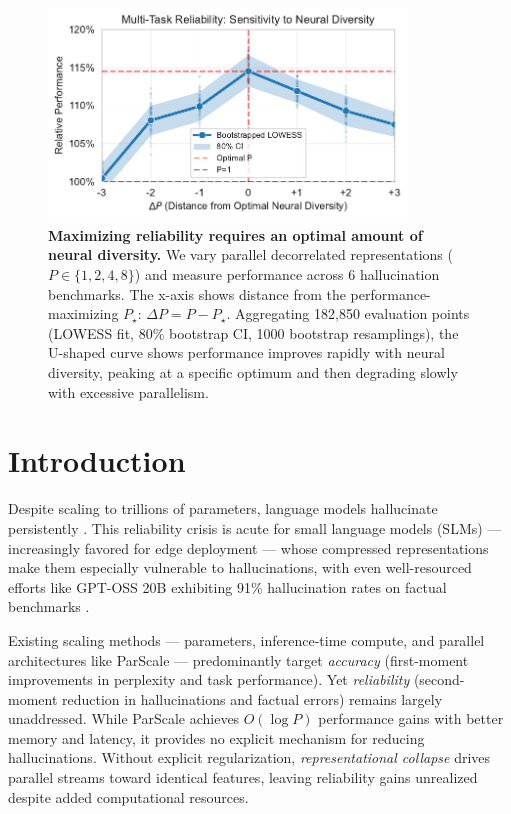 \documentclass{article} %
\begin{document}
\begin{figure}[ht]
  \begin{center}
    \includegraphics[width=0.85\textwidth]{assets/figure1_optimal_diversity.pdf}
  \end{center}
  \caption{
    \textbf{Maximizing reliability requires an optimal amount of neural diversity.} We vary parallel
    decorrelated representations ($P \in \{1,2,4,8\}$) and measure performance across 6 hallucination
    benchmarks. The x-axis shows distance from the performance-maximizing $P_\star$: $\Delta P = P -
    P_\star$. Aggregating 182,850 evaluation points (LOWESS fit, 80\% bootstrap CI, 1000 bootstrap
    resamplings), the U-shaped curve shows performance improves rapidly with neural diversity, peaking at a
    specific optimum and then degrading slowly with excessive parallelism.
  }
  \label{fig:optimaldiv}
\end{figure}

\section{Introduction}
Despite scaling to trillions of parameters, language models hallucinate persistently \citep{lin2021truthfulqa}.
This reliability crisis is acute for small language models (SLMs) --- increasingly favored for edge deployment
\citep{chen2024edge} --- whose compressed representations make them especially vulnerable to hallucinations, with
even well-resourced efforts like GPT-OSS 20B exhibiting 91\% hallucination rates on factual benchmarks
\citep{openai2025gptoss}.

Existing scaling methods --- parameters, inference-time compute, and parallel architectures like ParScale
\citep{chen2025parscale} --- predominantly target \emph{accuracy} (first-moment improvements in perplexity and
task performance). Yet \emph{reliability} (second-moment reduction in hallucinations and factual errors) remains
largely unaddressed. While ParScale achieves $O(\log P)$ performance gains with better memory and latency,
it provides no explicit mechanism for reducing hallucinations. Without explicit regularization,
\emph{representational collapse} \citep{jing2022dimensional} drives parallel streams toward identical features,
leaving reliability gains unrealized despite added computational resources.
\end{document}

